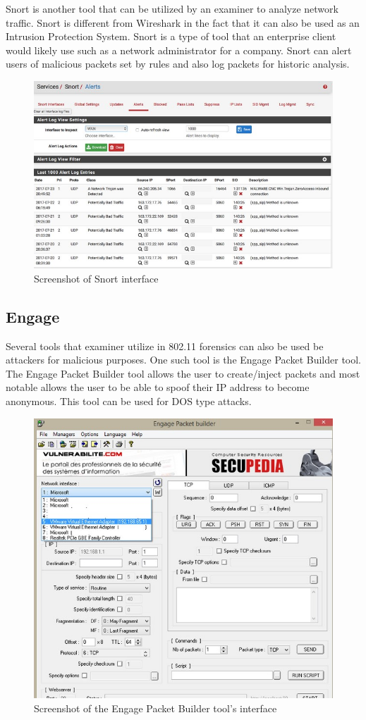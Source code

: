 \documentclass[acmlarge]{style/acmart}
\begin{document}
Snort is another tool that can be utilized by an examiner to analyze network traffic. Snort is different from Wireshark in the fact that it can also be used as an Intrusion Protection System. Snort is a type of tool that an enterprise client would likely use such as a network administrator for a company. Snort can alert users of malicious packets set by rules and also log packets for historic analysis. 

\begin{figure}[H]
  \centering
  \includegraphics[width=0.5\linewidth]{imgs/snort.jpg}
  \caption{Screenshot of Snort interface}
  \label{fig:snort}
\end{figure}

\subsection{Engage}

Several tools that examiner utilize in 802.11 forensics can also be used be attackers for malicious purposes. One such tool is the Engage Packet Builder tool. The Engage Packet Builder tool allows the user to create/inject packets and most notable allows the user to be able to spoof their IP address to become anonymous. This tool can be used for DOS type attacks. 

\begin{figure}[H]
  \centering
  \includegraphics[width=0.5\linewidth]{imgs/engage.jpg}
  \caption{Screenshot of the Engage Packet Builder tool's interface}
  \label{fig:engage}
\end{figure}
\end{document}
